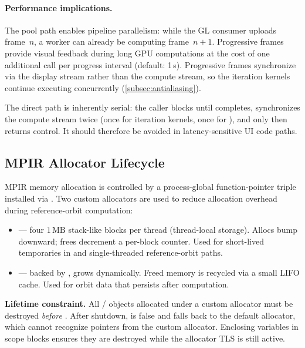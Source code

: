 \paragraph{Performance implications.}
The pool path enables pipeline parallelism: while the GL consumer
uploads frame~$n$, a worker can already be computing frame~$n\!+\!1$.
Progressive frames provide visual feedback during long GPU
computations at the cost of one additional 
call per progress interval (default: 1\,s).  Progressive frames
synchronize via the display stream rather than the compute stream,
so the iteration kernels continue executing concurrently
(\cref{subsec:antialiasing}).

The direct path is inherently serial: the caller blocks until
 completes, synchronizes the compute stream
twice (once for iteration kernels, once for ),
and only then returns control.  It should therefore be avoided in
latency-sensitive UI code paths.

\subsection{MPIR Allocator Lifecycle}
\label{subsec:mpir-allocator-lifecycle}

MPIR memory allocation is controlled by a process-global function-pointer
triple installed via .  Two custom allocators
are used to reduce allocation overhead during reference-orbit computation:

\begin{itemize}
  \item \textbf{} --- four $1\,\mathrm{MB}$
        stack-like blocks per thread (thread-local storage).  Allocs bump
        downward; frees decrement a per-block counter.  Used for short-lived
        temporaries in  and single-threaded reference-orbit
        paths.
  \item \textbf{} --- backed by
        , grows dynamically.  Freed memory is
        recycled via a small LIFO cache.  Used for  orbit
        data that persists after computation.
\end{itemize}

\textbf{Lifetime constraint.}  All  /  objects
allocated under a custom allocator must be destroyed \emph{before}
.  After shutdown,  is false and
 falls back to the default allocator, which cannot recognize
pointers from the custom allocator.  Enclosing  variables in
\code{\{\,\}} scope blocks ensures they are destroyed while the allocator TLS
is still active.

